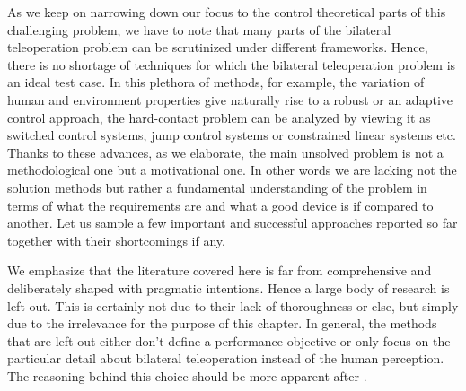 As we keep on narrowing down our focus to the control theoretical parts of this challenging problem, we have to 
note that many parts of the bilateral teleoperation problem can be scrutinized under different frameworks. 
Hence, there is no shortage of techniques for which the bilateral teleoperation problem is an ideal 
test case. In this plethora of methods, for example, the variation of human and environment properties give 
naturally rise to a robust or an adaptive control approach, the hard-contact problem can be analyzed by viewing it
as switched control systems, jump control systems or constrained linear systems etc. Thanks to these advances, 
as we elaborate, the main unsolved problem is not a methodological one but a motivational one. In
other words we are lacking not the solution methods but rather a fundamental understanding of the problem in terms of 
what the requirements are and what a good device is if compared to another. Let us sample a few important and 
successful approaches reported so far together with their shortcomings if any. 

We emphasize that the literature 
covered here is far from comprehensive and deliberately shaped with pragmatic intentions. Hence a large body of 
research is left out. This is certainly not due to their lack of thoroughness or else, but simply due to the irrelevance 
for the purpose of this chapter. In general, the methods that are left out either don't define a performance
objective or only focus on the particular detail about bilateral teleoperation instead of the human perception. 
The reasoning behind this choice should be more apparent after .


